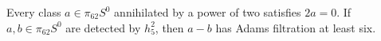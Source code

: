 \begin{proposition}
Every class $a\in\pi_{62}S^0$ annihilated by a power of two satisfies $2a=0$. If $a,b\in\pi_{62}S^0$ are detected by $h_5^2$, then $a-b$ has Adams filtration at least six.

\end{proposition}
